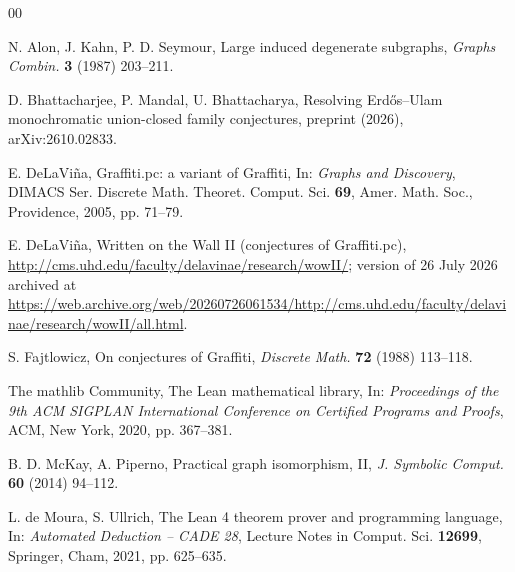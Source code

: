 \documentclass[10pt,a4paper]{article}
\begin{document}
 \begin{thebibliography}{00}

 N. Alon, J. Kahn, P. D. Seymour, Large induced degenerate subgraphs, {\it Graphs Combin.} {\bf 3} (1987) 203--211.

 D. Bhattacharjee, P. Mandal, U. Bhattacharya, Resolving Erd\H{o}s--Ulam monochromatic union-closed family conjectures, preprint (2026), arXiv:2610.02833.

 E. DeLaVi\~na, Graffiti.pc: a variant of Graffiti, In: {\it Graphs and Discovery}, DIMACS Ser. Discrete Math. Theoret. Comput. Sci. {\bf 69}, Amer. Math. Soc., Providence, 2005, pp. 71--79.

 E. DeLaVi\~na, Written on the Wall II (conjectures of Graffiti.pc), \url{http://cms.uhd.edu/faculty/delavinae/research/wowII/}; version of 26 July 2026 archived at \url{https://web.archive.org/web/20260726061534/http://cms.uhd.edu/faculty/delavinae/research/wowII/all.html}.

 S. Fajtlowicz, On conjectures of Graffiti, {\it Discrete Math.} {\bf 72} (1988) 113--118.

 The mathlib Community, The Lean mathematical library, In: {\it Proceedings of the 9th ACM SIGPLAN International Conference on Certified Programs and Proofs}, ACM, New York, 2020, pp. 367--381.

 B. D. McKay, A. Piperno, Practical graph isomorphism, II, {\it J. Symbolic Comput.} {\bf 60} (2014) 94--112.

 L. de Moura, S. Ullrich, The Lean 4 theorem prover and programming language, In: {\it Automated Deduction -- CADE 28}, Lecture Notes in Comput. Sci. {\bf 12699}, Springer, Cham, 2021, pp. 625--635.

\end{thebibliography}
\end{document}
